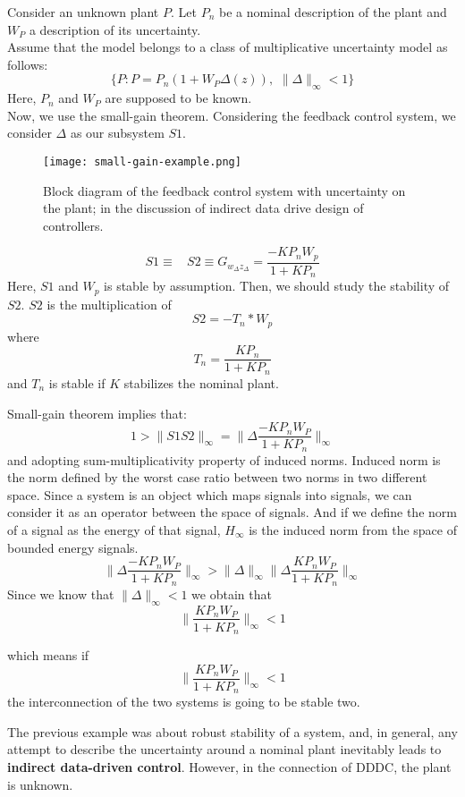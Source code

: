 \begin{example}[Example]
Consider an unknown plant $P$. Let $P_n$ be a nominal description of the plant and $W_P$ a description of its uncertainty.\\
Assume that the model belongs to a class of multiplicative uncertainty model as follows:
\[
\{P: P = P_n (1 + W_P \Delta(z)),\,\,\|\Delta\|_\infty <1 \}
\]
Here, $P_n$ and $W_P$ are supposed to be known. \\

Now, we use the small-gain theorem. Considering the feedback control system, we consider $\Delta$ as our subsystem $S1$. 
 \begin{figure}[H]
    \centering
    \texttt{[image: small-gain-example.png]}
    \caption{Block diagram of the feedback control system with uncertainty on the plant; in the discussion of indirect data drive design of controllers.}
 \end{figure}
 \[
 S1 \equiv \:\:\:\: S2 \equiv G_{w_\Delta z_\Delta} = \frac{-KP_nW_p}{1+KP_n}
 \]
 Here, $S1$ and $W_p$ is stable by assumption. Then, we should study the stability of $S2$. $S2$ is the multiplication of
 \[
 S2 = -T_n*W_p
 \]
 where
 \[
 T_n = \frac{KP_n}{1 + K P_n}
 \]
 and $T_n$ is stable if $K$ stabilizes the nominal plant.
 
 Small-gain theorem implies that:
 \[
 1 > \|S1S2\|_\infty = \|\Delta\frac{-KP_nW_P}{1 + KP_n}\|_\infty
 \]
 and adopting sum-multiplicativity property of induced norms. Induced norm is the norm defined by the worst case ratio between two norms in two different space. Since a system is an object which maps signals into signals, we can consider it as an operator between the space of signals. And if we define the norm of a signal as the energy of that signal, $H_\infty$ is the induced norm from the space of bounded energy signals.
 \[
 \|\Delta\frac{-KP_nW_P}{1 + KP_n}\|_\infty > \|\Delta\|_\infty \|\Delta\frac{KP_nW_P}{1 + KP_n}\|_\infty
 \]
 Since we know that $\|\Delta\|_\infty<1$ we obtain that 
 \[
 \|\frac{KP_nW_P}{1 + KP_n}\|_\infty < 1
 \]
 
\end{example}
\begin{example}
which means if 
\[
 \|\frac{KP_nW_P}{1 + KP_n}\|_\infty < 1
\]
the interconnection of the two systems is going to be stable two.
\end{example}


The previous example was about robust stability of a system, and, in general, any attempt to describe the uncertainty around a nominal plant inevitably leads to \textbf{indirect data-driven control}. However, in the connection of DDDC, the plant is unknown.\\

